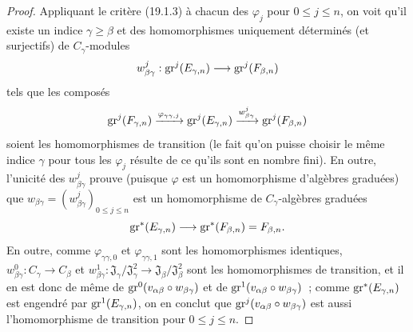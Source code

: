 \begin{proof}
Appliquant le critère (19.1.3) à chacun des $\varphi_j$ pour $0\leq j\leq n$,
on voit qu'il existe un indice $\gamma\geq\beta$ et des homomorphismes
uniquement déterminés (et surjectifs) de $C_\gamma$-modules
\[
  w_{\beta\gamma}^j:\operatorname{gr}^j(E_{\gamma,n})\longrightarrow
  \operatorname{gr}^j(F_{\beta,n})
\]
tels que les composés
\[
  \operatorname{gr}^j(F_{\gamma,n})
  \xrightarrow{\varphi_{\gamma\gamma,j}}\operatorname{gr}^j(E_{\gamma,n})
  \xrightarrow{w_{\beta\gamma}^j}\operatorname{gr}^j(F_{\beta,n})
\]
soient les homomorphismes de transition (le fait qu'on puisse choisir le même
indice $\gamma$ pour tous les $\varphi_j$ résulte de ce qu'ils sont en nombre
fini). En outre, l'unicité des $w_{\beta\gamma}^j$ prouve (puisque $\varphi$ est
un homomorphisme d'algèbres graduées) que
$w_{\beta\gamma}=(w_{\beta\gamma}^j)_{0\leq j\leq n}$ est un homomorphisme de
$C_\gamma$-algèbres graduées
\[
  \operatorname{gr}^*(E_{\gamma,n})\longrightarrow
  \operatorname{gr}^*(F_{\beta,n})=F_{\beta,n}.
\]
En outre, comme $\varphi_{\gamma\gamma,0}$ et $\varphi_{\gamma\gamma,1}$ sont
les homomorphismes identiques,
$w_{\beta\gamma}^0:C_\gamma\to C_\beta$ et
$w_{\beta\gamma}^1:\mathfrak J_\gamma/\mathfrak J_\gamma^2
\to\mathfrak J_\beta/\mathfrak J_\beta^2$ sont les homomorphismes de
transition, et il en est donc de même de
$\operatorname{gr}^0(v_{\alpha\beta}\circ w_{\beta\gamma})$ et de
$\operatorname{gr}^1(v_{\alpha\beta}\circ w_{\beta\gamma})$~; comme
$\operatorname{gr}^*(E_{\gamma,n})$ est engendré par $\operatorname{gr}^1(E_{\gamma,n})$, on en conclut que
$\operatorname{gr}^j(v_{\alpha\beta}\circ w_{\beta\gamma})$ est aussi l'homomorphisme de
transition pour $0\leq j\leq n$.


\end{proof}
